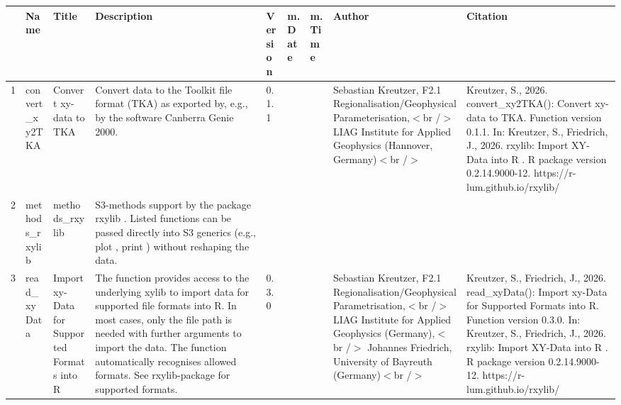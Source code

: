 \begin{table}[ht]
\centering
\begin{tabular}{rllllllll}
  \hline
 & Name & Title & Description & Version & m.Date & m.Time & Author & Citation \\ 
  \hline
1 & convert\_xy2TKA & Convert xy-data to TKA & Convert data to the Toolkit file format (TKA) as exported by, e.g., by the software Canberra Genie 2000. & 0.1.1
 &  &  & Sebastian Kreutzer, F2.1 Regionalisation/Geophysical Parameterisation,$<$br /$>$ LIAG Institute for Applied Geophysics (Hannover, Germany)$<$br /$>$ & Kreutzer, S., 2026. convert\_xy2TKA(): Convert xy-data to TKA. Function version 0.1.1. In: Kreutzer, S., Friedrich, J., 2026. rxylib: Import XY-Data into R . R package version 0.2.14.9000-12. https://r-lum.github.io/rxylib/
 \\ 
  2 & methods\_rxylib & methods\_rxylib & S3-methods support by the package  rxylib . Listed functions can be passed directly into S3 generics (e.g.,  plot ,  print ) without reshaping the data. &  &  &  &  &  \\ 
  3 & read\_xyData & Import xy-Data for Supported Formats into R & The function provides access to the underlying  xylib  to import data for supported file formats into R. In most cases, only the file path is needed with further arguments to import the data. The function automatically recognises allowed formats. See  rxylib-package  for supported formats. & 0.3.0
 &  &  & Sebastian Kreutzer, F2.1 Regionalisation/Geophysical Parametrisation,$<$br /$>$ LIAG Institute for Applied Geophysics (Germany),$<$br /$>$ Johannes Friedrich, University of Bayreuth (Germany)$<$br /$>$ & Kreutzer, S., Friedrich, J., 2026. read\_xyData(): Import xy-Data for Supported Formats into R. Function version 0.3.0. In: Kreutzer, S., Friedrich, J., 2026. rxylib: Import XY-Data into R . R package version 0.2.14.9000-12. https://r-lum.github.io/rxylib/
 \\ 
   \hline
\end{tabular}
\end{table}

